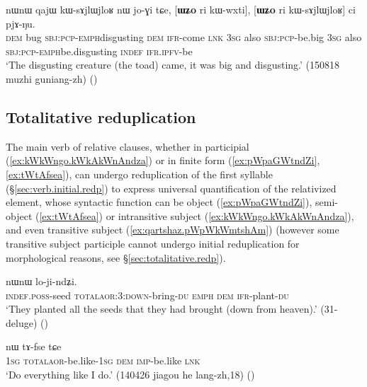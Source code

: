 \begin{exe}
\ex \label{ex:WZo.ri.kWwxti}
\gll nɯnɯ qajɯ kɯ-sɤjlɯ\redp{}jloʁ nɯ jo-ɣi tɕe,  [\textbf{ɯʑo} ri kɯ-wxti], [\textbf{ɯʑo} ri kɯ-sɤjlɯ\redp{}jloʁ] ci pjɤ-ŋu. \\
\textsc{dem} bug \textsc{sbj}:\textsc{pcp}-\textsc{emph}\redp{}disgusting \textsc{dem} \textsc{ifr}-come \textsc{lnk} 
\textsc{3sg} also \textsc{sbj}:\textsc{pcp}-be.big \textsc{3sg} also \textsc{sbj}:\textsc{pcp}-\textsc{emph}\redp{}be.disgusting \textsc{indef} \textsc{ifr}.\textsc{ipfv}-be \\
\glt `The disgusting creature (the toad) came, it was big and disgusting.' (150818 muzhi guniang-zh)
()
\end{exe}
 
\subsection{Totalitative reduplication} \label{sec:totalitative.relatives}
The main verb of relative clauses, whether in participial (\ref{ex:kWkWngo.kWkAkWnAndza}) or in finite form (\ref{ex:pWpaGWtndZi}, \ref{ex:tWtAfsea}), can undergo reduplication of the first syllable (§\ref{sec:verb.initial.redp}) to express universal quantification of the relativized element, whose syntactic function can be object (\ref{ex:pWpaGWtndZi}), semi-object (\ref{ex:tWtAfsea}) or intransitive subject (\ref{ex:kWkWngo.kWkAkWnAndza}), and even transitive subject (\ref{ex:qartshaz.pWpWkWmtshAm}) (however some transitive subject participle cannot undergo initial reduplication for morphological reasons, see §\ref{sec:totalitative.redp}).

\begin{exe}
\ex \label{ex:pWpaGWtndZi}
 nɯnɯ lo-ji-ndʑi. \\
\textsc{indef}.\textsc{poss}-seed \textsc{total}\redp{}\textsc{aor}:3\flobv{}:\textsc{down}-bring-\textsc{du} \textsc{emph} \textsc{dem} \textsc{ifr}-plant-\textsc{du} \\
\glt `They planted all the seeds that they had brought (down from heaven).' (31-deluge)
()
\end{exe}
  

\begin{exe}
\ex \label{ex:tWtAfsea}
 nɯ tɤ-fse tɕe \\
\textsc{1sg} \textsc{total}\redp{}\textsc{aor}-be.like-\textsc{1sg} \textsc{dem} \textsc{imp}-be.like \textsc{lnk} \\
\glt `Do everything like I do.' (140426 jiagou he lang-zh,18)
()
\end{exe}


